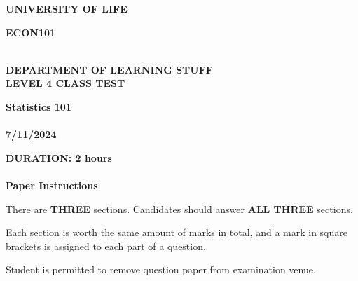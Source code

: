 \documentclass[a4paper, leqno, 12pt]{article} %
\begin{document}
\chead{}            %
\singlespacing

\begin{center}
\textbf{\large{     %
UNIVERSITY OF LIFE
}}
\end{center}

\begin{flushright}
\textbf{\large{ECON101}}
\end{flushright}
\vspace{-1cm}

\doublespacing
\begin{center}
\textbf{\large{   %
\\
DEPARTMENT OF LEARNING STUFF
\\
LEVEL 4 CLASS TEST}}
\end{center}

\begin{center}
\textbf{\large{
Statistics 101
\\
\quad
\\
7/11/2024}}

\textbf{\large{DURATION:} 2 hours
\\
\quad
\\
Paper Instructions}
\end{center}

\singlespacing
\noindent
There are \textbf{THREE} sections. Candidates should answer \textbf{ALL THREE} sections.

\medskip
\noindent
Each section is worth the same amount of marks in total, and a mark in square brackets is assigned to each part of a question.

\medskip
\noindent
Student is permitted to remove question paper from examination venue.


\newpage
\chead{\thepage}            %
\rfoot{}                %
\end{document}
